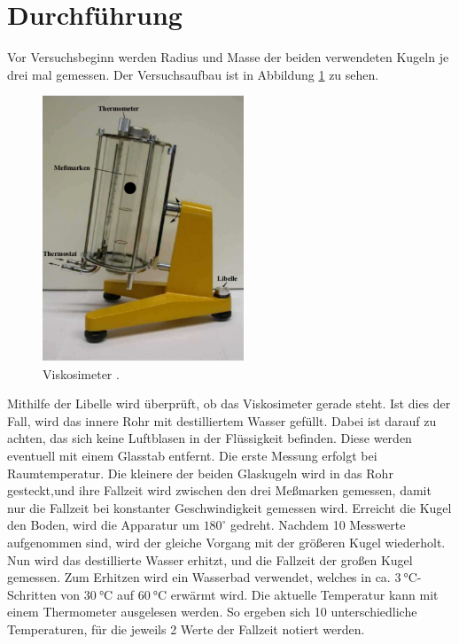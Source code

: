 \section{Durchführung}
\label{sec:Durchführung}
Vor Versuchsbeginn werden Radius und Masse der beiden verwendeten Kugeln je drei
mal gemessen. Der Versuchsaufbau ist in Abbildung \ref{fig:skizze} zu sehen.

\begin{figure}
  \centering
  \includegraphics[width=6cm]{bilder/visko.pdf}
  \caption{Viskosimeter \cite{anleitung107}.}
  \label{fig:skizze}
\end{figure}

\noindent Mithilfe der Libelle wird überprüft, ob das Viskosimeter gerade steht.
Ist dies der Fall, wird das innere Rohr mit destilliertem Wasser gefüllt. Dabei
ist darauf zu achten, das sich keine Luftblasen in der Flüssigkeit befinden.
Diese werden eventuell mit einem Glasstab entfernt.
\newline
\newline
Die erste Messung erfolgt bei Raumtemperatur. Die kleinere der beiden Glaskugeln
wird in das Rohr gesteckt,und ihre Fallzeit wird zwischen den drei Meßmarken gemessen,
damit nur die Fallzeit bei konstanter Geschwindigkeit gemessen wird. Erreicht die
Kugel den Boden, wird die Apparatur um $180^\circ$  gedreht. Nachdem 10 Messwerte
aufgenommen sind, wird der gleiche Vorgang mit der größeren Kugel wiederholt.
\newline
\newline
Nun wird das destillierte Wasser erhitzt, und die Fallzeit der großen Kugel gemessen.
Zum Erhitzen wird ein Wasserbad verwendet, welches in ca. $\SI{3}{\celsius}$-Schritten
von $\SI{30}{\celsius}$ auf $\SI{60}{\celsius}$ erwärmt wird. Die aktuelle Temperatur kann mit einem
Thermometer ausgelesen werden. So ergeben sich 10 unterschiedliche Temperaturen,
für die jeweils 2 Werte der Fallzeit notiert werden.
